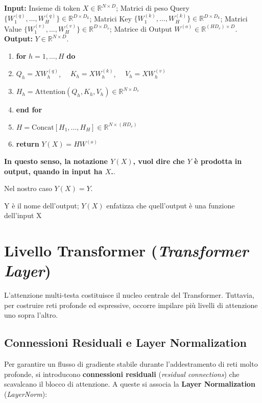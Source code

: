 \begin{tcolorbox}[colback=gray!5!white,colframe=gray!75!black,title=Algoritmo 12.2: Multi-Head Attention]
\textbf{Input:} Insieme di token $X \in \mathbb{R}^{N \times D}$; Matrici di peso Query $\{W_1^{(q)}, \dots, W_H^{(q)}\} \in \mathbb{R}^{D \times D_k}$; Matrici Key $\{W_1^{(k)}, \dots, W_H^{(k)}\} \in \mathbb{R}^{D \times D_k}$; Matrici Value $\{W_1^{(v)}, \dots, W_H^{(v)}\} \in \mathbb{R}^{D \times D_v}$; Matrice di Output $W^{(o)} \in \mathbb{R}^{(H D_v) \times D}$.\\
\textbf{Output:} $Y \in \mathbb{R}^{N \times D}$.
\begin{enumerate}
    \item \textbf{for} $h = 1, \dots, H$ \textbf{do}
    \item \quad $Q_h = X W_h^{(q)}$, $\quad K_h = X W_h^{(k)}$, $\quad V_h = X W_h^{(v)}$
    \item \quad $H_h = \text{Attention}(Q_h, K_h, V_h) \in \mathbb{R}^{N \times D_v}$
    \item \textbf{end for}
    \item $H = \text{Concat}\left[ H_1, \dots, H_H \right] \in \mathbb{R}^{N \times (H D_v)}$
    \item \textbf{return} $Y(X) = H W^{(o)}$
\end{enumerate}
\end{tcolorbox}

\textbf{In questo senso, la notazione $Y(X)$, vuol dire che $Y$ è prodotta in output, quando in input ha $X$.}.

Nel nostro caso $Y(X) = Y$.
\begin{center}
    Y è il nome dell'output; \(Y(X)\) enfatizza che quell'output è una funzione dell'input X
\end{center}


\section{Livello Transformer (\textit{Transformer Layer})}
L'attenzione multi-testa costituisce il nucleo centrale del Transformer. Tuttavia, per costruire reti profonde ed espressive, occorre impilare più livelli di attenzione uno sopra l'altro.

\subsection{Connessioni Residuali e Layer Normalization}
Per garantire un flusso di gradiente stabile durante l'addestramento di reti molto profonde, si introducono \textbf{connessioni residuali} (\textit{residual connections}) che scavalcano il blocco di attenzione. A queste si associa la \textbf{Layer Normalization} (\textit{LayerNorm}):

